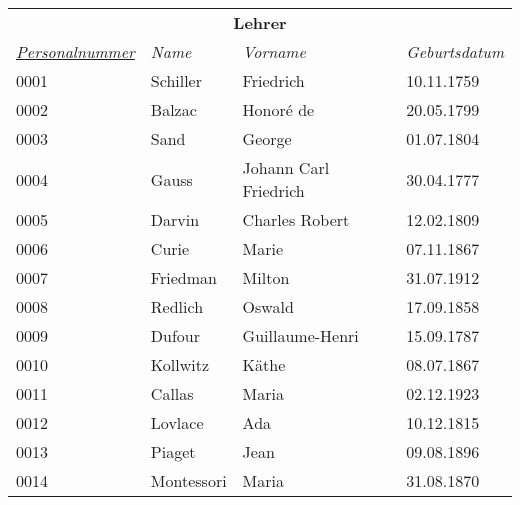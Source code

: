 \documentclass{standalone}
\begin{document}
\begin{tabular}{|l|l|l|l|}
    \hline
    \multicolumn{4}{c}{\cellcolor[HTML]{C0C0C0} \textbf{Lehrer}} \\
    \textit{\underline{Personalnummer}}&
    \textit{Name}&
    \textit{Vorname}&
    \textit{Geburtsdatum} \\ \hline
    0001&Schiller&Friedrich&10.11.1759\\
    0002&Balzac&Honoré de&20.05.1799\\
    0003&Sand&George&01.07.1804\\
    0004&Gauss&Johann Carl Friedrich&30.04.1777\\
    0005&Darvin&Charles Robert&12.02.1809\\
    0006&Curie&Marie&07.11.1867\\
    0007&Friedman&Milton&31.07.1912\\
    0008&Redlich&Oswald&17.09.1858\\
    0009&Dufour&Guillaume-Henri&15.09.1787\\
    0010&Kollwitz&Käthe&08.07.1867\\
    0011&Callas&Maria&02.12.1923\\
    0012&Lovlace&Ada&10.12.1815\\
    0013&Piaget&Jean&09.08.1896\\
    0014&Montessori&Maria&31.08.1870\\
    \hline
    \end{tabular}
\end{document}
